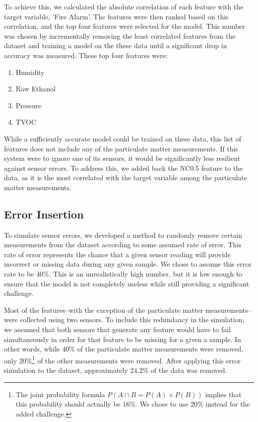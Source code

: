 \documentclass[conference]{IEEEtran}
\begin{document}
To achieve this, we calculated the absolute correlation of
each feature with the target variable, 'Fire Alarm'. The
features were then ranked based on this correlation, and the
top four features were selected for the model. This number
was chosen by incrementally removing the least correlated
features from the dataset and training a model on the these
data until a significant drop in accuracy was measured.
These top four features were:
\begin{enumerate}
    \item Humidity
    \item Raw Ethanol
    \item Pressure
    \item TVOC
\end{enumerate}
While a sufficiently accurate model could be trained on these data, this list of features does not include any of the particulate matter measurements. If this system were to ignore one of its sensors, it would be significantly less resilient against sensor errors. To address this, we added back the NC0.5 feature to the data, as it is the most correlated with the target variable among the particulate matter measurements.

\subsection{Error Insertion}
To simulate sensor errors, we developed a method to randomly remove certain measurements from the dataset according to some assumed rate of error. This rate of error represents the chance that a given sensor reading will provide incorrect or missing data during any given sample. We chose to assume this error rate to be 40\%. This is an unrealistically high number, but it is low enough to ensure that the model is not completely useless while still providing a significant challenge. 

Most of the features--with the exception of the particulate matter measurements--were collected using two sensors. To include this redundancy in the simulation, we assumed that both sensors that generate any feature would have to fail simultaneously in order for that feature to be missing for a given a sample. In other words, while 40\% of the particulate matter measurements were removed, only 20\%\footnote{The joint probability formula $P(A\cap B=P(A)\times P(B))$ implies that this probability should actually be 16\%. We chose to use 20\% instead for the added challenge.} of the other measurements were removed. After applying this error simulation to the dataset, approximately 24.2\% of the data was removed.
\end{document}
